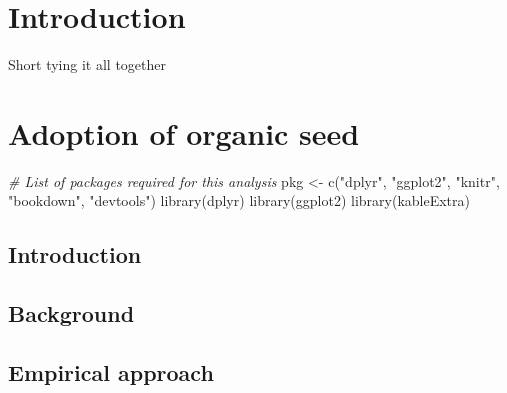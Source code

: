 \documentclass[twoside,12pt,final]{ucthesis-CA2012}
\newenvironment{Shaded}{}{}
\newcommand{\StringTok}[1]{\textcolor[rgb]{0.25,0.44,0.63}{{#1}}}
\newcommand{\CommentTok}[1]{\textcolor[rgb]{0.38,0.63,0.69}{\textit{{#1}}}}
\newcommand{\OtherTok}[1]{\textcolor[rgb]{0.00,0.44,0.13}{{#1}}}
\newcommand{\FunctionTok}[1]{\textcolor[rgb]{0.02,0.16,0.49}{{#1}}}
\newcommand{\NormalTok}[1]{{#1}}
\begin{document}
\begin{ucmainmatter}

\hypertarget{introduction}{%
\chapter*{Introduction}\label{introduction}}

Short tying it all together

\hypertarget{ch1-adoption}{%
\chapter{Adoption of organic seed}\label{ch1-adoption}}

\begin{Shaded}
\begin{Highlighting}[]
\CommentTok{\# List of packages required for this analysis}
\NormalTok{pkg }\OtherTok{\textless{}{-}} \FunctionTok{c}\NormalTok{(}\StringTok{"dplyr"}\NormalTok{, }\StringTok{"ggplot2"}\NormalTok{, }\StringTok{"knitr"}\NormalTok{, }\StringTok{"bookdown"}\NormalTok{, }\StringTok{"devtools"}\NormalTok{)}
\FunctionTok{library}\NormalTok{(dplyr)}
\FunctionTok{library}\NormalTok{(ggplot2)}
\FunctionTok{library}\NormalTok{(kableExtra)}
\end{Highlighting}
\end{Shaded}
\hypertarget{introduction-1}{%
\section{Introduction}\label{introduction-1}}

\hypertarget{background}{%
\section{Background}\label{background}}

\hypertarget{empirical-approach}{%
\section{Empirical approach}\label{empirical-approach}}

\hypertarget{results}{%
}
\end{ucmainmatter}
\end{document}
